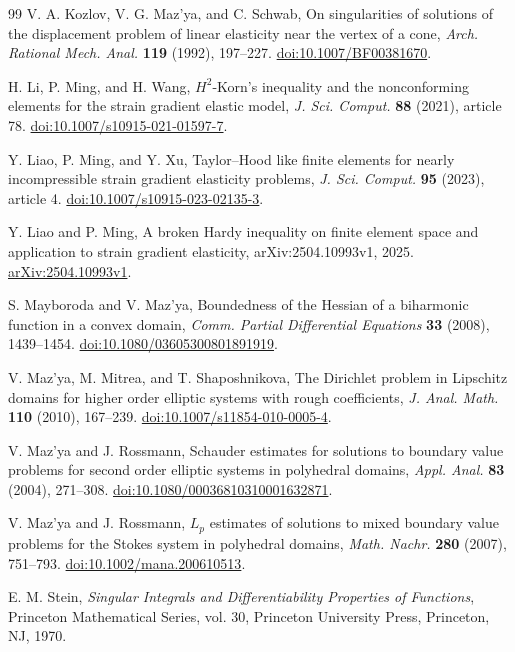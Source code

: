 \documentclass[11pt,a4paper]{article}
\theoremstyle{remark}
\numberwithin{equation}{section}
\begin{document}
\begin{thebibliography}{99}
V. A. Kozlov, V. G. Maz'ya, and C. Schwab,
On singularities of solutions of the displacement problem of linear
elasticity near the vertex of a cone,
\emph{Arch. Rational Mech. Anal.} \textbf{119} (1992), 197--227.
\href{https://doi.org/10.1007/BF00381670}{doi:10.1007/BF00381670}.

H. Li, P. Ming, and H. Wang,
$H^2$-Korn's inequality and the nonconforming elements for the
strain gradient elastic model,
\emph{J. Sci. Comput.} \textbf{88} (2021), article 78.
\href{https://doi.org/10.1007/s10915-021-01597-7}{doi:10.1007/s10915-021-01597-7}.

Y. Liao, P. Ming, and Y. Xu,
Taylor--Hood like finite elements for nearly incompressible
strain gradient elasticity problems,
\emph{J. Sci. Comput.} \textbf{95} (2023), article 4.
\href{https://doi.org/10.1007/s10915-023-02135-3}{doi:10.1007/s10915-023-02135-3}.

Y. Liao and P. Ming,
A broken Hardy inequality on finite element space and application to
strain gradient elasticity,
arXiv:2504.10993v1, 2025.
\href{https://arxiv.org/abs/2504.10993v1}{arXiv:2504.10993v1}.

S. Mayboroda and V. Maz'ya,
Boundedness of the Hessian of a biharmonic function in a convex domain,
\emph{Comm. Partial Differential Equations} \textbf{33} (2008), 1439--1454.
\href{https://doi.org/10.1080/03605300801891919}{doi:10.1080/03605300801891919}.

V. Maz'ya, M. Mitrea, and T. Shaposhnikova,
The Dirichlet problem in Lipschitz domains for higher order elliptic
systems with rough coefficients,
\emph{J. Anal. Math.} \textbf{110} (2010), 167--239.
\href{https://doi.org/10.1007/s11854-010-0005-4}{doi:10.1007/s11854-010-0005-4}.

V. Maz'ya and J. Rossmann,
Schauder estimates for solutions to boundary value problems for second
order elliptic systems in polyhedral domains,
\emph{Appl. Anal.} \textbf{83} (2004), 271--308.
\href{https://doi.org/10.1080/00036810310001632871}{doi:10.1080/00036810310001632871}.

V. Maz'ya and J. Rossmann,
\(L_p\) estimates of solutions to mixed boundary value problems for the
Stokes system in polyhedral domains,
\emph{Math. Nachr.} \textbf{280} (2007), 751--793.
\href{https://doi.org/10.1002/mana.200610513}{doi:10.1002/mana.200610513}.

E. M. Stein, \emph{Singular Integrals and Differentiability Properties
of Functions}, Princeton Mathematical Series, vol. 30,
Princeton University Press, Princeton, NJ, 1970.
\end{thebibliography}
\end{document}
